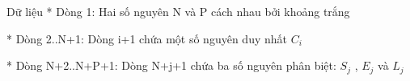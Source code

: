 Dữ liệu
* Dòng 1: Hai số nguyên N và P cách nhau bởi khoảng trắng  

   * Dòng 2..N+1: Dòng i+1 chứa một số nguyên duy nhất $C_{i}$

   * Dòng N+2..N+P+1: Dòng N+j+1 chứa ba số nguyên phân biệt: $S_{j}$   , $E_{j}$   và $L_{j}$